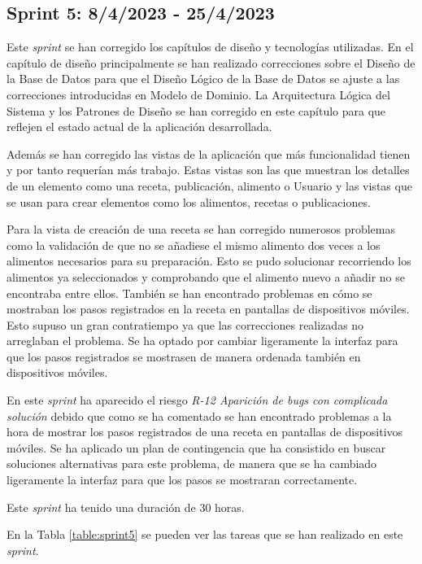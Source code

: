 \subsection{Sprint 5: 8/4/2023 - 25/4/2023}
Este \textit{sprint} se han corregido los capítulos de diseño y tecnologías utilizadas. En el capítulo de diseño principalmente se han realizado correcciones sobre el Diseño de la Base de Datos para que el Diseño Lógico de la Base de Datos se ajuste a las correcciones introducidas en Modelo de Dominio. La Arquitectura Lógica del Sistema y los Patrones de Diseño se han corregido en este capítulo para que reflejen el estado actual de la aplicación desarrollada.

Además se han corregido las vistas de la aplicación que más funcionalidad tienen y por tanto requerían más trabajo. Estas vistas son las que muestran los detalles de un elemento como una receta, publicación, alimento o Usuario y las vistas que se usan para crear elementos como los alimentos, recetas o publicaciones.

Para la vista de creación de una receta se han corregido numerosos problemas como la validación de que no se añadiese el mismo alimento dos veces a los alimentos necesarios para su preparación. Esto se pudo solucionar recorriendo los alimentos ya seleccionados y comprobando que el alimento nuevo a añadir no se encontraba entre ellos. También se han encontrado problemas en cómo se mostraban los pasos registrados en la receta en pantallas de dispositivos móviles. Esto supuso un gran contratiempo ya que las correcciones realizadas no arreglaban el problema. Se ha optado por cambiar ligeramente la interfaz para que los pasos registrados se mostrasen de manera ordenada también en dispositivos móviles.

En este \textit{sprint} ha aparecido el riesgo \textit{R-12 Aparición de bugs con complicada solución} debido que como se ha comentado se han encontrado problemas a la hora de mostrar los pasos registrados de una receta en pantallas de dispositivos móviles. Se ha aplicado un plan de contingencia que ha consistido en buscar soluciones alternativas para este problema, de manera que se ha cambiado ligeramente la interfaz para que los pasos se mostraran correctamente. 

Este \textit{sprint} ha tenido una duración de 30 horas.

En la Tabla \ref{table:sprint5} se pueden ver las tareas que se han realizado en este \textit{sprint}.


